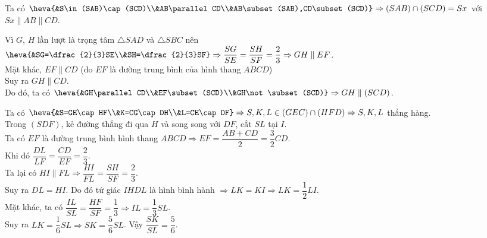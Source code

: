 \begin{bt}
{\begin{listEX}[1]
			\item Ta có $\heva{&S\in(SAB)\cap(SCD)\\&AB\parallel CD\\&AB\subset(SAB),CD\subset(SCD)}\Rightarrow (SAB)\cap(SCD)=Sx$ với $Sx\parallel AB\parallel CD$.
			\item Vì $G$, $H$ lần lượt là trọng tâm $\triangle SAD$ và $\triangle SBC$ nên $\heva{&SG=\dfrac{2}{3}SE\\&SH=\dfrac{2}{3}SF}\Rightarrow \dfrac{SG}{SE}=\dfrac{SH}{SF}=\dfrac{2}{3}\Rightarrow GH\parallel EF$.\\
			Mặt khác, $EF\parallel CD$ (do $EF$ là đường trung bình của hình thang $ABCD$)\\
			Suy ra $GH\parallel CD$.\\
			Do đó, ta có $\heva{&GH\parallel CD\\&EF\subset (SCD)\\&GH\not\subset (SCD)}\Rightarrow GH\parallel (SCD)$.
			\item Ta có $\heva{&S=GE\cap HF\\&K=CG\cap DH\\&L=CE\cap DF}\Rightarrow S,K,L \in (GEC)\cap(HFD)\Rightarrow S,K,L$ thẳng hàng.\\
			Trong $(SDF)$, kẻ đường thẳng đi qua $H$ và song song với $DF$, cắt $SL$ tại $I$.\\
			Ta có $EF$ là đường trung bình hình thang $ABCD\Rightarrow EF=\dfrac{AB+CD}{2}=\dfrac{3}{2}CD$.\\
			Khi đó $\dfrac{DL}{LF}=\dfrac{CD}{EF}=\dfrac{2}{3}$.\\
			Ta lại có $HI\parallel FL\Rightarrow \dfrac{HI}{FL}=\dfrac{SH}{SF}=\dfrac{2}{3}$.\\
			Suy ra $DL=HI$. Do đó tứ giác $IHDL$ là hình bình hành $\Rightarrow LK=KI\Rightarrow LK=\dfrac{1}{2}LI$.\\
			Mặt khác, ta có $\dfrac{IL}{SL}=\dfrac{HF}{SF}=\dfrac{1}{3}\Rightarrow IL=\dfrac{1}{3}SL$.\\
			Suy ra $LK=\dfrac{1}{6}SL\Rightarrow SK=\dfrac{5}{6}SL$. Vậy $\dfrac{SK}{SL}=\dfrac{5}{6}$.
		\end{listEX}	
	}
\end{bt}

